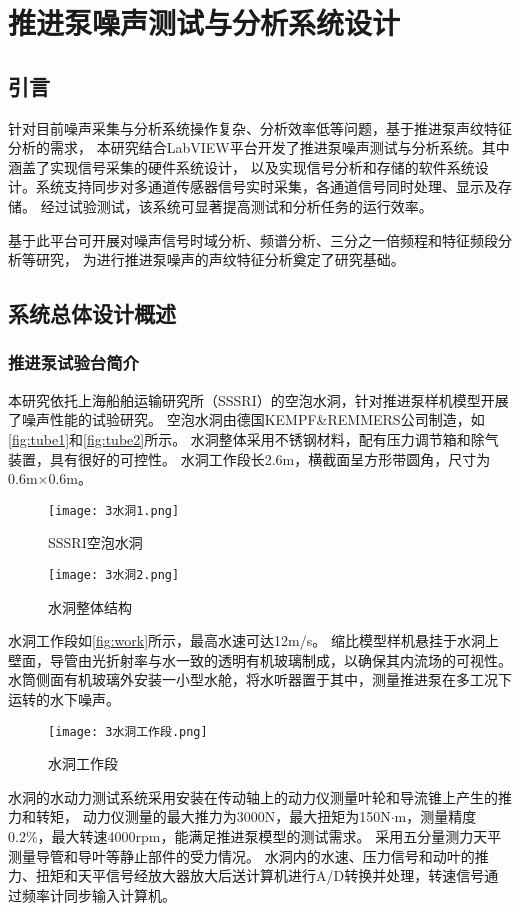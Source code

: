\chapter{推进泵噪声测试与分析系统设计}
\section{引言}
针对目前噪声采集与分析系统操作复杂、分析效率低等问题，基于推进泵声纹特征分析的需求，
本研究结合LabVIEW平台开发了推进泵噪声测试与分析系统。其中涵盖了实现信号采集的硬件系统设计，
以及实现信号分析和存储的软件系统设计。系统支持同步对多通道传感器信号实时采集，各通道信号同时处理、显示及存储。
经过试验测试，该系统可显著提高测试和分析任务的运行效率。

基于此平台可开展对噪声信号时域分析、频谱分析、三分之一倍频程和特征频段分析等研究，
为进行推进泵噪声的声纹特征分析奠定了研究基础。
\section{系统总体设计概述}
\subsection{推进泵试验台简介}
本研究依托上海船舶运输研究所（SSSRI）的空泡水洞，针对推进泵样机模型开展了噪声性能的试验研究。
空泡水洞由德国KEMPF\&REMMERS公司制造，如\autoref{fig:tube1}和\autoref{fig:tube2}所示。
水洞整体采用不锈钢材料，配有压力调节箱和除气装置，具有很好的可控性。
水洞工作段长2.6m，横截面呈方形带圆角，尺寸为0.6m×0.6m。
\begin{figure}[htbp]
    \centering
    \texttt{[image: 3水洞1.png]}
    \caption{\label{fig:tube1}SSSRI空泡水洞}
\end{figure}
\begin{figure}[htbp]
    \centering
    \texttt{[image: 3水洞2.png]}
    \caption{\label{fig:tube2}水洞整体结构}
\end{figure}

水洞工作段如\autoref{fig:work}所示，最高水速可达12m/s。
缩比模型样机悬挂于水洞上壁面，导管由光折射率与水一致的透明有机玻璃制成，以确保其内流场的可视性。
水筒侧面有机玻璃外安装一小型水舱，将水听器置于其中，测量推进泵在多工况下运转的水下噪声。
\begin{figure}[htbp]
    \centering
    \texttt{[image: 3水洞工作段.png]}
    \caption{\label{fig:work}水洞工作段}
\end{figure}

水洞的水动力测试系统采用安装在传动轴上的动力仪测量叶轮和导流锥上产生的推力和转矩，
动力仪测量的最大推力为3000N，最大扭矩为150N$\cdot$m，测量精度0.2\%，最大转速4000rpm，能满足推进泵模型的测试需求。
采用五分量测力天平测量导管和导叶等静止部件的受力情况。
水洞内的水速、压力信号和动叶的推力、扭矩和天平信号经放大器放大后送计算机进行A/D转换并处理，转速信号通过频率计同步输入计算机。

